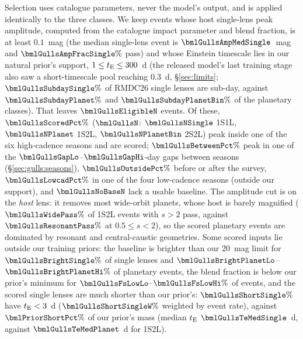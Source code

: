 Selection uses catalogue parameters, never the model's output, and is applied identically to the
three classes. We keep events whose host single-lens peak amplitude, computed from the catalogue impact
parameter and blend fraction, is at least $0.1$~mag (the median single-lens event is
$\bmlGullsAmpMedSingle$~mag and $\bmlGullsAmpFracSingle\%$ pass) and whose Einstein timescale lies in
our natural prior's support, $1 \le t_{\rm E} \le 300$~d (the released model's last training stage
also saw a short-timescale pool reaching $0.3$~d, \S\ref{sec:limits}; $\bmlGullsSubdaySingle\%$ of RMDC26 single lenses are
sub-day, against $\bmlGullsSubdayPlanet\%$ and $\bmlGullsSubdayPlanetBin\%$ of the planetary classes).
That leaves $\bmlGullsEligibleN$ events. Of these, $\bmlGullsScoredPct\%$ ($\bmlGullsN$:
$\bmlGullsNSingle$ 1S1L, $\bmlGullsNPlanet$ 1S2L, $\bmlGullsNPlanetBin$ 2S2L) peak inside one of the
six high-cadence seasons and are scored; $\bmlGullsBetweenPct\%$ peak in one of the
$\bmlGullsGapLo$--$\bmlGullsGapHi$-day gaps between seasons (\S\ref{sec:gulls:seasons}),
$\bmlGullsOutsidePct\%$ before or after the survey, $\bmlGullsLowcadPct\%$ in one of the four
low-cadence seasons (outside our support), and $\bmlGullsNoBaseN$ lack a usable baseline. The
amplitude cut is on the \emph{host} lens: it removes most wide-orbit planets, whose host is barely
magnified ($\bmlGullsWidePass\%$ of 1S2L events with $s > 2$ pass, against $\bmlGullsResonantPass\%$ at
$0.5 \le s < 2$), so the scored planetary events are dominated by resonant and central-caustic
geometries. Some scored inputs lie outside our training priors: the baseline is brighter than our
20~mag limit for $\bmlGullsBrightSingle\%$ of single lenses and $\bmlGullsBrightPlanetLo$--$\bmlGullsBrightPlanetHi\%$
of planetary events, the blend fraction is below our prior's minimum for
$\bmlGullsFsLowLo$--$\bmlGullsFsLowHi\%$ of events, and the scored single lenses are much shorter than our
prior's: $\bmlGullsShortSingle\%$ have $t_{\rm E} < 3$~d ($\bmlGullsShortSingleW\%$ weighted by event rate),
against $\bmlPriorShortPct\%$ of our prior's mass (median $t_{\rm E}$ $\bmlGullsTeMedSingle$~d, against
$\bmlGullsTeMedPlanet$~d for 1S2L).

